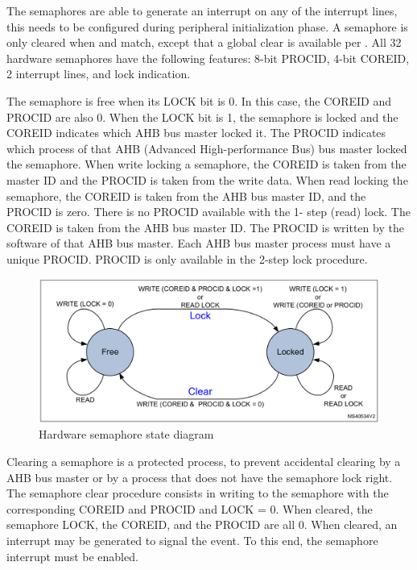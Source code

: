 The semaphores are able to generate an interrupt on any of the interrupt lines, this needs to be configured during peripheral initialization phase. A semaphore is only cleared when  and  match, except that a global clear is available per . All 32 hardware semaphores have the following features: 8-bit PROCID, 4-bit COREID, 2 interrupt lines, and lock indication.

The semaphore is free when its LOCK bit is 0. In this case, the COREID and PROCID are also 0. When the LOCK bit is 1, the semaphore is locked and the COREID indicates which AHB bus master locked it. The PROCID indicates which process of that AHB (Advanced High-performance Bus) bus master locked the semaphore. When write locking a semaphore, the COREID is taken from the master ID and the PROCID is taken from the write data. When read locking the semaphore, the COREID is taken from the AHB bus master ID, and the PROCID is zero. There is no PROCID available with the 1- step (read) lock. The COREID is taken from the AHB bus master ID. The PROCID is written by the software of that AHB bus master. Each AHB bus master process must have a unique PROCID. PROCID is only available in the 2-step lock procedure.

\begin{figure}[!ht]
    \centering
    \includegraphics[width=150mm, keepaspectratio]{figures/hw-semaphore.png}
    \caption{Hardware semaphore state diagram \cite{HWSemaphore}}
    \label{fig:HWSemaphore}
\end{figure}

Clearing a semaphore is a protected process, to prevent accidental clearing by a AHB bus master or by a process that does not have the semaphore lock right. The semaphore clear procedure consists in writing to the semaphore with the corresponding COREID and PROCID and LOCK = 0. When cleared, the semaphore LOCK, the COREID, and the PROCID are all 0. When cleared, an interrupt may be generated to signal the event. To this end, the semaphore interrupt must be enabled.
